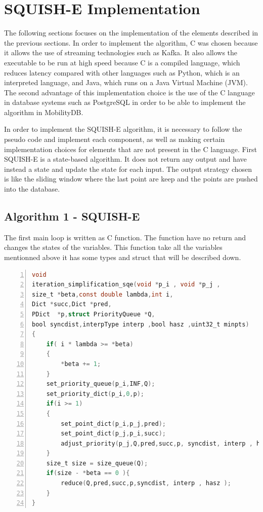 

\section{SQUISH-E Implementation}
The following sections focuses on the implementation of the elements described in the previous sections. In order to implement the algorithm, C was chosen because it allows the use of streaming technologies such as Kafka. It also allows the executable to be run at high speed because C is a compiled language, which reduces latency compared with other languages such as Python, which is an interpreted language, and Java, which runs on a Java Virtual Machine (JVM). The second advantage of this implementation choice is the use of the C language in database systems such as PostgreSQL in order to be able to implement the algorithm in MobilityDB.

In order to implement the SQUISH-E algorithm, it is necessary to follow the pseudo code and implement each component, as well as making certain implementation choices for elements that are not present in the C language. First SQUISH-E is a state-based algorithm. It does not return any output and have instead a state and update the state for each input. The output strategy chosen is like the sliding window where the last point are keep and the points are pushed into the database. 

\subsection{Algorithm 1 - SQUISH-E}

The first main loop is written as C function. The function have no return and changes the states of the variables.  This function take all the variables mentionned above it has some types and struct that will be described down. 

\begin{lstlisting}[float=ht,language=C, % Spécifie le langage du code
caption={Listing of the SQUISH-E algorithm implemented in C.}, % Légende du listing
label=lst:squish_c, % Étiquette pour référencer le listing
numbers=left,
numberstyle=\tiny\color{gray},
stepnumber=1,
frame=single,
breaklines=true,
postbreak=\mbox{\textcolor{red}{$\hookrightarrow$}\space},
showstringspaces=false
]
void
iteration_simplification_sqe(void *p_i , void *p_j ,
size_t *beta,const double lambda,int i,
Dict *succ,Dict *pred,
PDict  *p,struct PriorityQueue *Q,
bool syncdist,interpType interp ,bool hasz ,uint32_t minpts)
{
	if( i * lambda >= *beta)
	{
		*beta += 1;
	}
	set_priority_queue(p_i,INF,Q);
	set_priority_dict(p_i,0,p);
	if(i >= 1)
	{
		set_point_dict(p_i,p_j,pred);
		set_point_dict(p_j,p_i,succ);
		adjust_priority(p_j,Q,pred,succ,p, syncdist, interp , hasz );
	}
	size_t size = size_queue(Q);
	if(size - *beta == 0 ){
		reduce(Q,pred,succ,p,syncdist, interp , hasz );
	}
}
\end{lstlisting}


